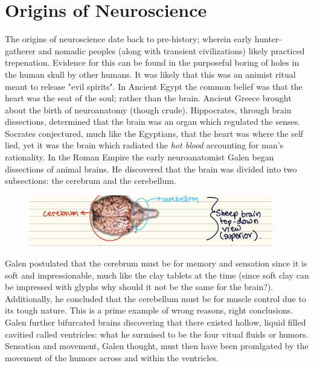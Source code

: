 

\section{Origins of Neuroscience}

The origins of neuroscience date back to pre-history; wherein early hunter-gatherer and nomadic peoples (along with transient civilizations) likely practiced trepenation. Evidence for this can be found in the purposeful boring of holes in the human skull by other humans. It was likely that this was an animist ritual meant to release "evil spirits". In Ancient Egypt the common belief was that the heart was the seat of the soul; rather than the brain. Ancient Greece brought about the birth of neuroanatomy (though crude). Hippocrates, through brain dissections, determined that the brain was an organ which regulated the senses. Socrates conjectured, much like the Egyptians, that the heart was where the self lied, yet it was the brain which radiated the \textit{hot blood} accounting for man's rationality. In the Roman Empire the early neuroanatomist Galen began dissections of animal brains. He discovered that the brain was divided into two subsections: the cerebrum and the cerebellum. 

\begin{figure}[H]
  \begin{center}
    \includegraphics[width=0.95\textwidth]{figures/sheepbrain.png}
  \end{center}
  \caption{}\label{fig:Sheep Brain}
\end{figure}

Galen postulated that the cerebrum must be for memory and sensation since it is soft and impressionable, much like the clay tablets at the time (since soft clay can be impressed with glyphs why should it not be the same for the brain?). Additionally, he concluded that the cerebellum must be for muscle control due to its tough nature. This is a prime example of wrong reasons, right conclusions. Galen further bifurcated brains discovering that there existed hollow, liquid filled cavitied called ventricles: what he surmised to be the four vitual fluids or humors. Sensation and movement, Galen thought, must then have been promlgated by the movement of the humors across and within the ventricles.

